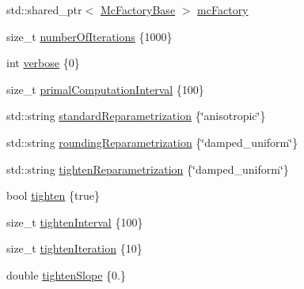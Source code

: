 \begin{DoxyCompactItemize}
\item 
std\+::shared\+\_\+ptr$<$ \hyperlink{classnifty_1_1graph_1_1optimization_1_1multicut_1_1MulticutMp_a43262185c61afcc95eb125ac9d6d0305}{Mc\+Factory\+Base} $>$ \hyperlink{structnifty_1_1graph_1_1optimization_1_1multicut_1_1MulticutMp_1_1SettingsType_aef85a11dbd0c5177a3f96ea16ec0fb7f}{mc\+Factory}
\item 
size\+\_\+t \hyperlink{structnifty_1_1graph_1_1optimization_1_1multicut_1_1MulticutMp_1_1SettingsType_abfc51e400040b3a18f6b5c03764b9aa5}{number\+Of\+Iterations} \{1000\}
\item 
int \hyperlink{structnifty_1_1graph_1_1optimization_1_1multicut_1_1MulticutMp_1_1SettingsType_a9c5d06bfe96084985dd4cb55abe5969f}{verbose} \{0\}
\item 
size\+\_\+t \hyperlink{structnifty_1_1graph_1_1optimization_1_1multicut_1_1MulticutMp_1_1SettingsType_ac6ceb5db91b3d240508fb37bbc85254a}{primal\+Computation\+Interval} \{100\}
\item 
std\+::string \hyperlink{structnifty_1_1graph_1_1optimization_1_1multicut_1_1MulticutMp_1_1SettingsType_a352f2675b3d6991dd83cfd96db13f3ca}{standard\+Reparametrization} \{\char`\"{}anisotropic\char`\"{}\}
\item 
std\+::string \hyperlink{structnifty_1_1graph_1_1optimization_1_1multicut_1_1MulticutMp_1_1SettingsType_afa4e11376e27f3dfd39be6d0ba5a695b}{rounding\+Reparametrization} \{\char`\"{}damped\+\_\+uniform\char`\"{}\}
\item 
std\+::string \hyperlink{structnifty_1_1graph_1_1optimization_1_1multicut_1_1MulticutMp_1_1SettingsType_a9d16357d8eb700af1ce8f08f9873f5c9}{tighten\+Reparametrization} \{\char`\"{}damped\+\_\+uniform\char`\"{}\}
\item 
bool \hyperlink{structnifty_1_1graph_1_1optimization_1_1multicut_1_1MulticutMp_1_1SettingsType_a04b43df73c344376ed21dd0e1bd5cbd2}{tighten} \{true\}
\item 
size\+\_\+t \hyperlink{structnifty_1_1graph_1_1optimization_1_1multicut_1_1MulticutMp_1_1SettingsType_acfad93b0629f9b39199ecd8287f54373}{tighten\+Interval} \{100\}
\item 
size\+\_\+t \hyperlink{structnifty_1_1graph_1_1optimization_1_1multicut_1_1MulticutMp_1_1SettingsType_adc612218f342a3b12cc31dc4a2560038}{tighten\+Iteration} \{10\}
\item 
double \hyperlink{structnifty_1_1graph_1_1optimization_1_1multicut_1_1MulticutMp_1_1SettingsType_a03c8c33c725f5d8fbdcfcd2458a83e86}{tighten\+Slope} \{0.\}

\end{DoxyCompactItemize}
